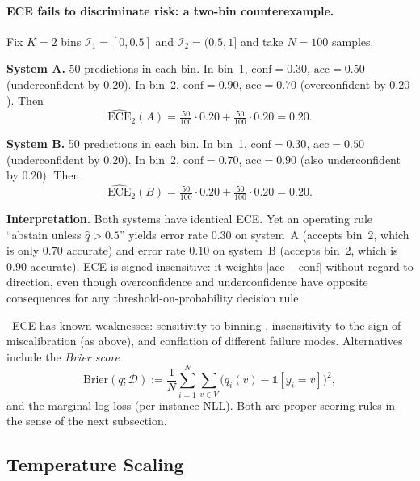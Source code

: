 \paragraph{ECE fails to discriminate risk: a two-bin counterexample.}
\begin{workedexample}
Fix $K = 2$ bins $\mathcal{I}_1 = [0, 0.5]$ and
$\mathcal{I}_2 = (0.5, 1]$ and take $N = 100$ samples.

\textbf{System A.} 50 predictions in each bin. In bin~1,
$\mathrm{conf} = 0.30$, $\mathrm{acc} = 0.50$ (underconfident by $0.20$).
In bin~2, $\mathrm{conf} = 0.90$, $\mathrm{acc} = 0.70$ (overconfident
by $0.20$). Then
\[
\widehat{\mathrm{ECE}}_2(A) = \tfrac{50}{100} \cdot 0.20 + \tfrac{50}{100} \cdot 0.20 = 0.20.
\]

\textbf{System B.} 50 predictions in each bin. In bin~1,
$\mathrm{conf} = 0.30$, $\mathrm{acc} = 0.50$ (underconfident by
$0.20$). In bin~2, $\mathrm{conf} = 0.70$, $\mathrm{acc} = 0.90$
(also underconfident by $0.20$). Then
\[
\widehat{\mathrm{ECE}}_2(B) = \tfrac{50}{100} \cdot 0.20 + \tfrac{50}{100} \cdot 0.20 = 0.20.
\]

\textbf{Interpretation.} Both systems have identical ECE. Yet an
operating rule ``abstain unless $\hat q > 0.5$'' yields error rate
$0.30$ on system~A (accepts bin~2, which is only $0.70$ accurate) and
error rate $0.10$ on system~B (accepts bin~2, which is $0.90$
accurate). ECE is signed-insensitive: it weights
$|\mathrm{acc} - \mathrm{conf}|$ without regard to direction, even
though overconfidence and underconfidence have opposite consequences
for any threshold-on-probability decision rule.
\end{workedexample}

\Cons\ ECE has known weaknesses: sensitivity to binning
\citep{kumar2019ece, nixon2019measuring}, insensitivity to the sign of
miscalibration (as above), and conflation of different failure modes.
Alternatives include the \emph{Brier score}
\begin{equation}
\mathrm{Brier}(q; \mathcal{D})
  := \frac{1}{N} \sum_{i=1}^{N} \sum_{v \in V}
       \big( q_i(v) - \mathbb{1}[y_i = v] \big)^2,
\label{eq:brier}
\end{equation}
and the marginal log-loss (per-instance NLL). Both are proper scoring
rules in the sense of the next subsection.

\subsection{Temperature Scaling}

